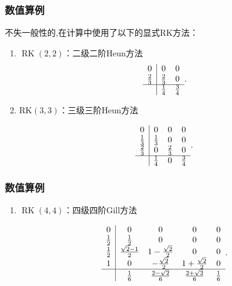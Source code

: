 \documentclass[aspectratio=169]{beamer}
\numberwithin{theorem}{section} %
\numberwithin{equation}{section}%
\numberwithin{figure}{section}%
\numberwithin{table}{section}%
\begin{document}
\begin{frame}\frametitle{数值算例}
	不失一般性的,在计算中使用了以下的显式RK方法\cite{shuEfficientImplementationEssentially1988}：
	\begin{enumerate}
	\item $\operatorname{RK}(2,2)$：二级二阶Heun方法%
	\begin{equation}
	\begin{array}{c|cc}
	0 & 0 & 0 \\
	\frac{2}{3} & \frac{2}{3} & 0 \\
	\hline & \frac{1}{4} & \frac{3}{4}
	\end{array}.
	\end{equation}
		
	\item $\mathrm{RK}(3,3)$：三级三阶Heun方法%
		
	\begin{equation}
	\begin{array}{c|ccc}
	0 & 0 & 0 & 0 \\
	\frac{1}{3} & \frac{1}{3} & 0 & 0 \\
	\frac{2}{3} & 0 & \frac{2}{3} & 0 \\
	\hline & \frac{1}{4} & 0 & \frac{3}{4}
	\end{array}.
	\end{equation}
	\end{enumerate}
\end{frame}
\begin{frame}\frametitle{数值算例}
	
	\begin{enumerate}[3]
		\item $\operatorname{RK}(4,4)$：四级四阶Gill方法%
			
	\begin{equation}
	\begin{array}{c|cccc}
	0 & 0 & 0 & 0 & 0 \\
	\frac{1}{2} & \frac{1}{2} & 0 & 0 & 0 \\
	\frac{1}{2} & \frac{\sqrt{2}-1}{2} & 1-\frac{\sqrt{2}}{2} & 0 & 0 \\
	1 & 0 & -\frac{\sqrt{2}}{2} & 1+\frac{\sqrt{2}}{2} & 0 \\
	\hline & \frac{1}{6} & \frac{2-\sqrt{2}}{6} & \frac{2+\sqrt{2}}{6} & \frac{1}{6}
	\end{array}.
	\end{equation}
	\end{enumerate}
\end{frame}
\end{document}
